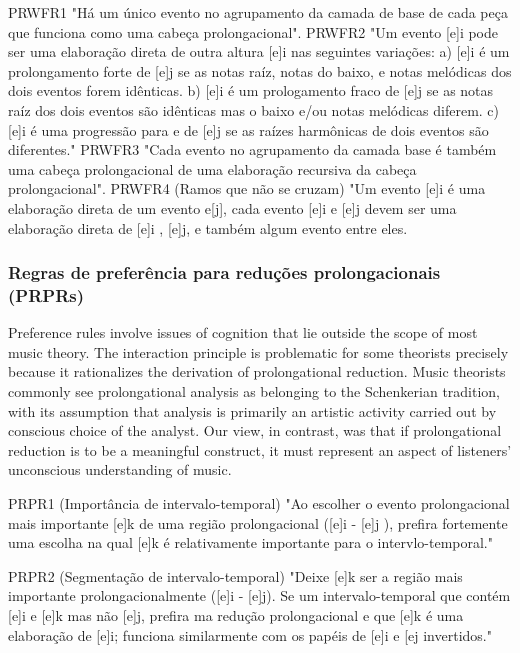 \documentclass[
	12pt,				%
	openright,			%
	twoside,			%
	a4paper,			%
	english,			%
	french,				%
	spanish,			%
	brazil				%
	]{abntex2}
\begin{document}
\begin{citacao}
PRWFR1 "Há um único evento no agrupamento da camada de base de cada peça que funciona como uma cabeça prolongacional".\linebreak
PRWFR2 "Um evento [e]i pode ser uma elaboração direta de outra altura [e]i nas seguintes variações:\linebreak
a) [e]i é um prolongamento forte de [e]j se as notas raíz, notas do baixo, e notas melódicas dos dois eventos forem idênticas.\linebreak
b) [e]i é um prologamento fraco de [e]j se as notas raíz dos dois eventos são idênticas mas o baixo e/ou notas melódicas diferem. \linebreak
c) [e]i é uma progressão para e de [e]j se as raízes harmônicas de dois eventos são diferentes."\linebreak
PRWFR3 "Cada evento no agrupamento da camada base é também uma cabeça prolongacional de uma elaboração recursiva da cabeça prolongacional".\linebreak
PRWFR4 (Ramos que não se cruzam) "Um evento [e]i é uma elaboração direta de um evento e[j], cada evento [e]i e [e]j devem ser uma elaboração direta de [e]i , [e]j, e também algum evento entre eles. 
 \cite[ p.144-145]{lerdahl1983generative}
\end{citacao}

 
\subsubsection{Regras de preferência para reduções prolongacionais (PRPRs)}

\begin{citacao}
Preference rules involve issues of cognition that lie outside the scope of
most music theory. The interaction principle is problematic for some theorists precisely because it rationalizes the derivation of prolongational reduction. Music theorists commonly see prolongational analysis as belonging to the Schenkerian tradition, with its assumption that analysis is primarily an artistic activity carried out by conscious choice of the analyst. Our view, in contrast, was that if prolongational reduction is to be a meaningful construct, it must represent an aspect of listeners’ unconscious understanding of music.
\end{citacao}
\cite{lerdahl2009genesis}





\begin{citacao}
PRPR1 (Importância de intervalo-temporal) "Ao escolher o evento prolongacional mais importante [e]k de uma região prolongacional ([e]i - [e]j ), prefira fortemente uma escolha na qual [e]k é relativamente importante para o intervlo-temporal." 

PRPR2 (Segmentação de intervalo-temporal) "Deixe [e]k ser a região mais importante prolongacionalmente ([e]i - [e]j). Se um intervalo-temporal que contém [e]i e [e]k mas não [e]j, prefira ma redução prolongacional e que [e]k é uma elaboração de [e]i; funciona similarmente com os papéis de [e]i e [ej invertidos." 
 \cite{lerdahl1983generative}
\end{citacao}
\end{document}
